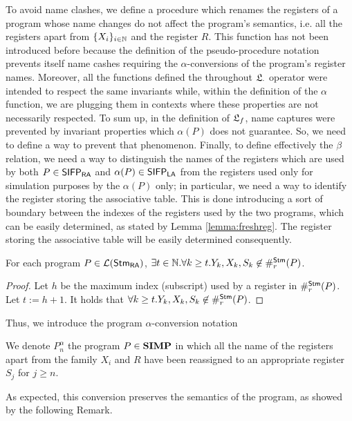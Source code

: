 To avoid name clashes, we define a procedure which renames
the registers of a program whose name changes do not affect the program's
semantics, i.e. all the registers apart from $\{X_i\}_{i\in\mathbb{N}}$ and the register $R$.
%
This function has not been introduced before because the definition of the
pseudo-procedure notation prevents itself name cashes requiring the
$\alpha$-conversions of the program's register names. Moreover, all the functions
defined  the throughout ${\mathfrak L_{\cdot}}$ operator were intended to respect the same invariants
while, within the definition of the $\alpha$ function,
we are plugging them in contexts where these
properties are not necessarily respected.
%
To sum up, in the definition of ${\mathfrak L_{f}}$, name captures were prevented by invariant
properties which $\alpha(P)$ does not guarantee. So, we need to define a way to
prevent that phenomenon.
%
Finally, to define
effectively the $\beta$ relation, we need a way to distinguish the
names of the registers which are used by both $P \in \mathsf{SIFP_{{\mathsf{RA}}}}$
and $\alpha(P) \in \mathsf{SIFP_{{\mathsf{LA}}}}$ from the registers used only for simulation purposes by the
$\alpha(P)$ only; in particular, we need a way to identify the
register storing the associative table.
This is done introducing a sort of boundary between the
indexes of the registers used by the two programs, which can be easily
determined, as stated by Lemma \ref{lemma:freshreg}. The register storing the
associative table will be easily determined consequently.
%
\begin{lemma}
  \label{lemma:freshreg}
  For each program $P \in {\mathcal L ({\mathsf{Stm}_{\mathsf{RA}}})}$,
  $\exists t \in \mathbb{N}. \forall k\ge t. Y_{k}, X_k, S_k\not \in\#_r^{\mathsf{Stm}}(P)$.
\end{lemma}
\begin{proof}
 Let $h$ be the maximum index (subscript)
 used by a register in $\#_r^{\mathsf{Stm}}(P)$. Let $t:=h+1$.
 It holds that $\forall k\ge t.Y_k, X_k, S_k\not \in\#_r^{\mathsf{Stm}}(P)$.
\end{proof}
\noindent
Thus, we introduce the program $\alpha$-conversion notation




\begin{notation}
  \label{notation:alpha}
  We denote $P^\alpha_n$ the program $P\in \mathbf{SIMP}$
  in which all the name of the registers apart from the family $X_i$ and $R$
  have been reassigned to an appropriate register $S_j$ for $j\ge n$.
\end{notation}

As expected, this conversion preserves the semantics of the program, as
showed by the following Remark.

